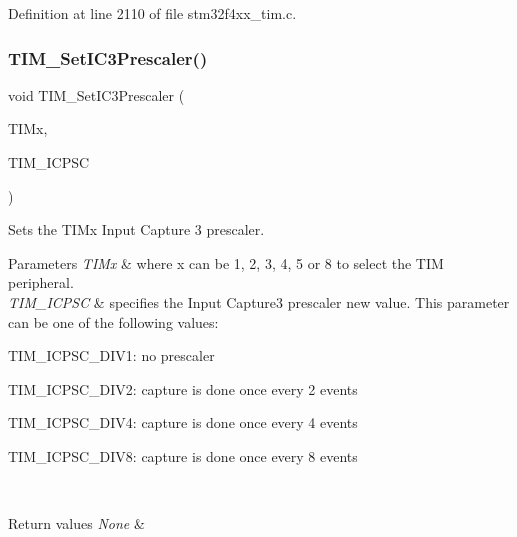 Definition at line 2110 of file stm32f4xx\+\_\+tim.\+c.

\mbox{\label{group___t_i_m___group3_ga76f906383b8132ebe00dffadb70cf7f9}} 
\subsubsection{\texorpdfstring{T\+I\+M\+\_\+\+Set\+I\+C3\+Prescaler()}{TIM\_SetIC3Prescaler()}}
{\footnotesize\ttfamily void T\+I\+M\+\_\+\+Set\+I\+C3\+Prescaler (\begin{DoxyParamCaption}\item[{\hyperlink{struct_t_i_m___type_def}{T\+I\+M\+\_\+\+Type\+Def} $\ast$}]{T\+I\+Mx,  }\item[{uint16\+\_\+t}]{T\+I\+M\+\_\+\+I\+C\+P\+SC }\end{DoxyParamCaption})}



Sets the T\+I\+Mx Input Capture 3 prescaler. 


\begin{DoxyParams}{Parameters}
{\em T\+I\+Mx} & where x can be 1, 2, 3, 4, 5 or 8 to select the T\+IM peripheral. \\
\hline
{\em T\+I\+M\+\_\+\+I\+C\+P\+SC} & specifies the Input Capture3 prescaler new value. This parameter can be one of the following values\+: \begin{DoxyItemize}
\item T\+I\+M\+\_\+\+I\+C\+P\+S\+C\+\_\+\+D\+I\+V1\+: no prescaler \item T\+I\+M\+\_\+\+I\+C\+P\+S\+C\+\_\+\+D\+I\+V2\+: capture is done once every 2 events \item T\+I\+M\+\_\+\+I\+C\+P\+S\+C\+\_\+\+D\+I\+V4\+: capture is done once every 4 events \item T\+I\+M\+\_\+\+I\+C\+P\+S\+C\+\_\+\+D\+I\+V8\+: capture is done once every 8 events \end{DoxyItemize}
\\
\hline
\end{DoxyParams}

\begin{DoxyRetVals}{Return values}
{\em None} & \\
\hline
\end{DoxyRetVals}


